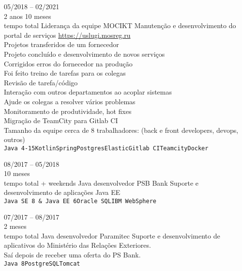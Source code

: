 \begin{entrylist}
    \entry
    {05/2018 -- 02/2021\\\footnotesize{2 anos 10 meses\\tempo total}}
    {Liderança da equipe}
    {MOCIKT}
    {
        Manutenção e desenvolvimento do portal de serviços \url{https://uslugi.mosreg.ru} \\
        Projetos transferidos de um fornecedor \\
        Projeto concluído e desenvolvimento de novos serviços \\
        Corrigidos erros do fornecedor na produção \\
        Foi feito treino de tarefas para os colegas \\
        Revisão de tarefa/código \\
        Interação com outros departamentos ao acoplar sistemas \\
        Ajude os colegas a resolver vários problemas \\
        Monitoramento de produtividade, hot fixes \\
    Migração de TeamCity para Gitlab CI \\
    Tamanho da equipe cerca de 8 trabalhadores: (back e front developers, devops, outros) \\
    \texttt{Java 4-15}\slashsep\texttt{Kotlin}\slashsep\texttt{Spring}\slashsep\texttt{Postgres}\slashsep\texttt{Elastic}\slashsep\texttt{Gitlab CI}\slashsep\texttt{Teamcity}\slashsep\texttt{Docker}
	}

    \entry
    {08/2017 -- 05/2018\\\footnotesize{10 meses\\tempo total + weekends}}
    {Java desenvolvedor}
    {PSB Bank}
    {
        Suporte e desenvolvimento de aplicações Java EE \\
        \texttt{Java SE 8 \& Java EE 6}\slashsep\texttt{Oracle SQL}\slashsep\texttt{IBM WebSphere}
    }
    
    \entry
    {07/2017 -- 08/2017\\\footnotesize{2 meses\\tempo total}}
    {Java desenvolvedor}
    {Paramitec}
    {
        Suporte e desenvolvimento de aplicativos do Ministério das Relações Exteriores. \\
        Saí depois de receber uma oferta do PS Bank. \\
        \texttt{Java 8}\slashsep\texttt{PostgreSQL}\slashsep\texttt{Tomcat}
    }
    

\end{entrylist}
